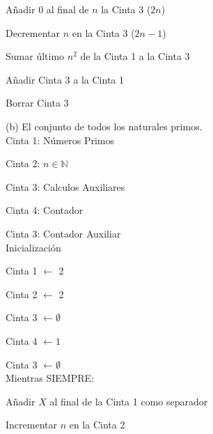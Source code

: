\documentclass{article}
\begin{document}
\hspace{1.5cm}Añadir $0$ al final de $n$ la Cinta 3 ($2n$)

\hspace{1.5cm}Decrementar $n$ en la Cinta 3 ($2n - 1$)

\hspace{1.5cm}Sumar último $n^{2}$ de la Cinta 1 a la Cinta 3

\hspace{1.5cm}Añadir Cinta 3 a la Cinta 1

\hspace{1.5cm}Borrar Cinta 3

\newpage


(b) El conjunto de todos los naturales primos.\\

\hspace{1cm}Cinta 1: Números Primos

\hspace{1cm}Cinta 2: $n \in \mathbb{N}$

\hspace{1cm}Cinta 3: Calculos Auxiliares

\hspace{1cm}Cinta 4: Contador

\hspace{1cm}Cinta 3: Contador Auxiliar\\

\hspace{1cm}Inicialización

\hspace{1.5cm}Cinta 1 $\leftarrow$ 2

\hspace{1.5cm}Cinta 2 $\leftarrow$ 2

\hspace{1.5cm}Cinta 3 $\leftarrow \emptyset$

\hspace{1.5cm}Cinta 4 $\leftarrow 1$

\hspace{1.5cm}Cinta 3 $\leftarrow \emptyset$\\

\hspace{1cm}Mientras SIEMPRE:

\hspace{1.5cm}Añadir $X$ al final de la Cinta 1 como separador

\hspace{1.5cm}Incrementar $n$ en la Cinta 2
\end{document}
